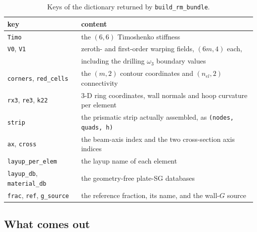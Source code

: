 \begin{table}[htbp]
\centering
\small
\begin{tabular}{ll}
\toprule
key & content \\
\midrule
\texttt{Timo} & the $(6,6)$ Timoshenko stiffness \\
\texttt{V0}, \texttt{V1} & zeroth- and first-order warping fields, $(6m,4)$ each, \\
                         & including the drilling $\omega_3$ boundary values \\
\texttt{corners}, \texttt{red\_cells} & the $(m,2)$ contour coordinates and $(n_{el},2)$ connectivity \\
\texttt{rx3}, \texttt{re3}, \texttt{k22} & 3-D ring coordinates, wall normals and hoop curvature per element \\
\texttt{strip} & the prismatic strip actually assembled, as \texttt{(nodes, quads, h)} \\
\texttt{ax}, \texttt{cross} & the beam-axis index and the two cross-section axis indices \\
\texttt{layup\_per\_elem} & the layup name of each element \\
\texttt{layup\_db}, \texttt{material\_db} & the geometry-free plate-SG databases \\
\texttt{frac}, \texttt{ref}, \texttt{g\_source} & the reference fraction, its name, and the wall-$G$ source \\
\bottomrule
\end{tabular}
\caption{Keys of the dictionary returned by \texttt{build\_rm\_bundle}.}
\label{tab:shell-bundle-keys}
\end{table}

\subsection{What comes out}

